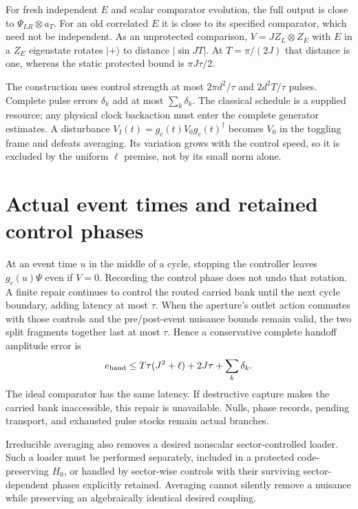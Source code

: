 \documentclass[11pt,oneside,openany]{book}
\theoremstyle{definition}
\theoremstyle{remark}\newtheorem{remark}[theorem]{Remark}
\begin{document}
For fresh independent $E$ and scalar comparator evolution, the full output is close to $\Psi_{LR}\otimes a_T$. For an old correlated $E$ it is close to its specified comparator, which need not be independent. As an unprotected comparison, $V=JZ_L\otimes Z_E$ with $E$ in a $Z_E$ eigenstate rotates $|+\rangle$ to distance $|\sin JT|$. At $T=\pi/(2J)$ that distance is one, whereas the static protected bound is $\pi J\tau/2$.

The construction uses control strength at most $2\pi d^2/\tau$ and $2d^2T/\tau$ pulses. Complete pulse errors $\delta_k$ add at most $\sum_k\delta_k$. The classical schedule is a supplied resource; any physical clock backaction must enter the complete generator estimates. A disturbance $V_I(t)=g_c(t)V_0g_c(t)^\dagger$ becomes $V_0$ in the toggling frame and defeats averaging. Its variation grows with the control speed, so it is excluded by the uniform $\ell$ premise, not by its small norm alone.

\section{Actual event times and retained control phases}

At an event time $u$ in the middle of a cycle, stopping the controller leaves $g_c(u)\Psi$ even if $V=0$. Recording the control phase does not undo that rotation. A finite repair continues to control the routed carried bank until the next cycle boundary, adding latency at most $\tau$. When the aperture's outlet action commutes with those controls and the pre/post-event nuisance bounds remain valid, the two split fragments together last at most $\tau$. Hence a conservative complete handoff amplitude error is
\begin{equation}
 e_{\rm hand}\le T\tau(J^2+\ell)+2J\tau+\sum_k\delta_k.
 \label{prot:handoff}
\end{equation}
The ideal comparator has the same latency. If destructive capture makes the carried bank inaccessible, this repair is unavailable. Nulls, phase records, pending transport, and exhausted pulse stocks remain actual branches.

Irreducible averaging also removes a desired nonscalar sector-controlled loader. Such a loader must be performed separately, included in a protected code-preserving $H_0$, or handled by sector-wise controls with their surviving sector-dependent phases explicitly retained. Averaging cannot silently remove a nuisance while preserving an algebraically identical desired coupling.
\end{document}

